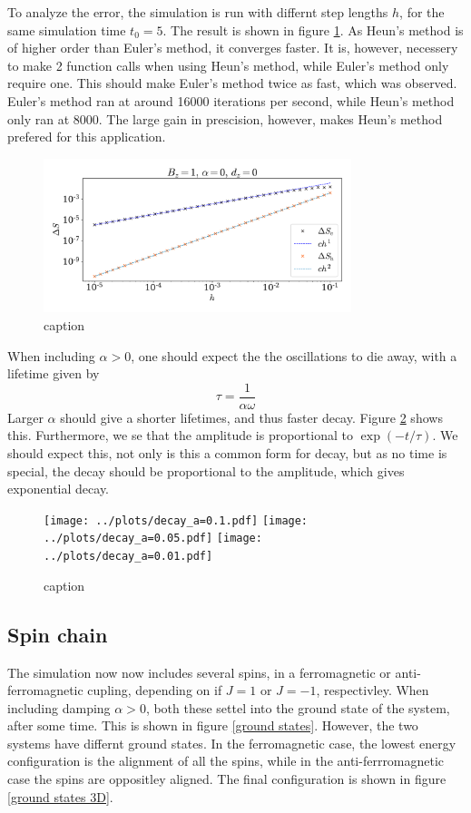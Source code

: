 \documentclass{article}
\begin{document}
    To analyze the error, the simulation is run with differnt step lengths $h$, for the same simulation time $t_0 = 5$. The result is shown in figure \ref{error}. As Heun's method is of higher order than Euler's method, it converges faster. It is, however, necessery to make 2 function calls when using Heun's method, while Euler's method only require one. This should make Euler's method twice as fast, which was observed. Euler's method ran at around 16000 iterations per second, while Heun's method only ran at 8000. The large gain in prescision, however, makes Heun's method prefered for this application. 

    \begin{figure}
        \centering
        \includegraphics[width=0.8\textwidth]{../plots/err.pdf}
        \caption{caption}
        \label{error}
    \end{figure}

    When including $\alpha > 0$, one should expect the the oscillations to die away, with a lifetime given by
    \begin{equation*}
        \tau = \frac{1}{\alpha \omega}
    \end{equation*}
    Larger $\alpha$ should give a shorter lifetimes, and thus faster decay. Figure \ref{decay} shows this. Furthermore, we se that the amplitude is proportional to $\exp(-t/\tau)$. We should expect this, not only is this a common form for decay, but as no time is special, the decay should be proportional to the amplitude, which gives exponential decay.

    \begin{figure}
        \centering
        \texttt{[image: ../plots/decay\_a=0.1.pdf]}
        \texttt{[image: ../plots/decay\_a=0.05.pdf]}
        \texttt{[image: ../plots/decay\_a=0.01.pdf]}
        \caption{caption}
        \label{decay}
    \end{figure}

    \subsection*{Spin chain}
    The simulation now now includes several spins, in a ferromagnetic or anti-ferromagnetic cupling, depending on if $J = 1$ or $J = -1$, respectivley. When including damping $\alpha > 0$, both these settel into the ground state of the system, after some time. This is shown in figure \ref{ground states}. However, the two systems have differnt ground states. In the ferromagnetic case, the lowest energy configuration is the alignment of all the spins, while in the anti-ferrromagnetic case the spins are oppositley aligned. The final configuration is shown in figure \ref{ground states 3D}.
\end{document}
